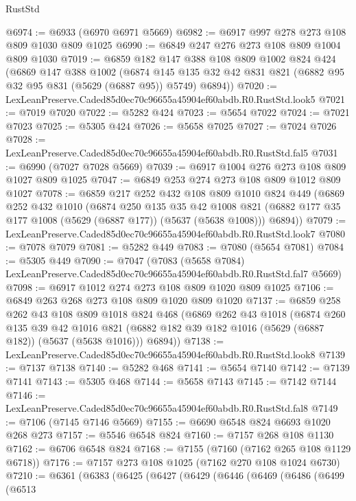 \begin{lexlean}{RustStd}
\begin{coremodule}
@6974 := @6933 (@6970 @6971 @5669)
@6982 := @6917 @997 @278 @273 @108 @809 @1030 @809 @1025
@6990 := @6849 @247 @276 @273 @108 @809 @1004 @809 @1030
@7019 := @6859
    @182
    @147
    @388
    @108
    @809
    @1002
    @824
    @424
    (@6869
      @147
      @388
      @1002
      (@6874 @145 @135 @32 @42 @831 @821 (@6882 @95 @32 @95 @831 (@5629 (@6887 @95)) @5749) @6894))
@7020 := LexLeanPreserve.Caded85d0ec70c96655a45904ef60abdb.R0.RustStd.look5
@7021 := @7019 @7020
@7022 := @5282 @424
@7023 := @5654 @7022
@7024 := @7021 @7023
@7025 := @5305 @424
@7026 := @5658 @7025
@7027 := @7024 @7026
@7028 := LexLeanPreserve.Caded85d0ec70c96655a45904ef60abdb.R0.RustStd.fal5
@7031 := @6990 (@7027 @7028 @5669)
@7039 := @6917 @1004 @276 @273 @108 @809 @1027 @809 @1025
@7047 := @6849 @253 @274 @273 @108 @809 @1012 @809 @1027
@7078 := @6859
    @217
    @252
    @432
    @108
    @809
    @1010
    @824
    @449
    (@6869
      @252
      @432
      @1010
      (@6874
        @250
        @135
        @35
        @42
        @1008
        @821
        (@6882 @177 @35 @177 @1008 (@5629 (@6887 @177)) (@5637 (@5638 @1008)))
        @6894))
@7079 := LexLeanPreserve.Caded85d0ec70c96655a45904ef60abdb.R0.RustStd.look7
@7080 := @7078 @7079
@7081 := @5282 @449
@7083 := @7080 (@5654 @7081)
@7084 := @5305 @449
@7090 := @7047
    (@7083 (@5658 @7084) LexLeanPreserve.Caded85d0ec70c96655a45904ef60abdb.R0.RustStd.fal7 @5669)
@7098 := @6917 @1012 @274 @273 @108 @809 @1020 @809 @1025
@7106 := @6849 @263 @268 @273 @108 @809 @1020 @809 @1020
@7137 := @6859
    @258
    @262
    @43
    @108
    @809
    @1018
    @824
    @468
    (@6869
      @262
      @43
      @1018
      (@6874
        @260
        @135
        @39
        @42
        @1016
        @821
        (@6882 @182 @39 @182 @1016 (@5629 (@6887 @182)) (@5637 (@5638 @1016)))
        @6894))
@7138 := LexLeanPreserve.Caded85d0ec70c96655a45904ef60abdb.R0.RustStd.look8
@7139 := @7137 @7138
@7140 := @5282 @468
@7141 := @5654 @7140
@7142 := @7139 @7141
@7143 := @5305 @468
@7144 := @5658 @7143
@7145 := @7142 @7144
@7146 := LexLeanPreserve.Caded85d0ec70c96655a45904ef60abdb.R0.RustStd.fal8
@7149 := @7106 (@7145 @7146 @5669)
@7155 := @6690 @6548 @824 @6693 @1020 @268 @273
@7157 := @5546 @6548 @824
@7160 := @7157 @268 @108 @1130
@7162 := @6706 @6548 @824
@7168 := @7155 (@7160 (@7162 @265 @108 @1129 @6718))
@7176 := @7157 @273 @108 @1025 (@7162 @270 @108 @1024 @6730)
@7210 := @6361
    (@6383
      (@6425
        (@6427
          (@6429
            (@6446
              (@6469
                (@6486
                  (@6499
                    (@6513

\end{coremodule}
\end{lexlean}
